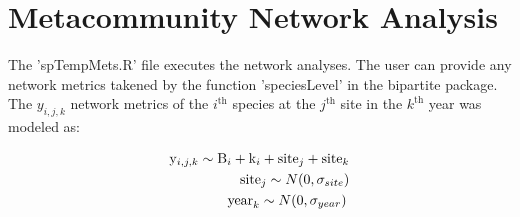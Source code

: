 \documentclass{article}\usepackage[]{graphicx}\usepackage[]{color}
\begin{document}
\section{Metacommunity Network Analysis}

The 'spTempMets.R' file executes the network analyses. The  user can
provide any network metrics takened by the function 'speciesLevel' in
the bipartite package. The  $y_{i,j,k}$ network
metrics of the $i^{\mathrm{th}}$ species at the $j^{\mathrm{th}}$ site
in the $k^{\mathrm{th}}$ year was modeled as:

%
\begin{equation}
  \label{eq:lms}
    \begin{split}
    \mathrm{y}_{i,j,k} \sim \mathrm{B}_{i} + \mathrm{k}_{i} +
    \mathrm{site}_{j} + \mathrm{site}_{k} \\   
     \mathrm{site}_{j} \sim N(0, \sigma_{site}) \\  
     \mathrm{year}_{k} \sim N(0, \sigma_{year})
  \hspace{0.2em}
    \end{split}
\end{equation}
%
\end{document}
